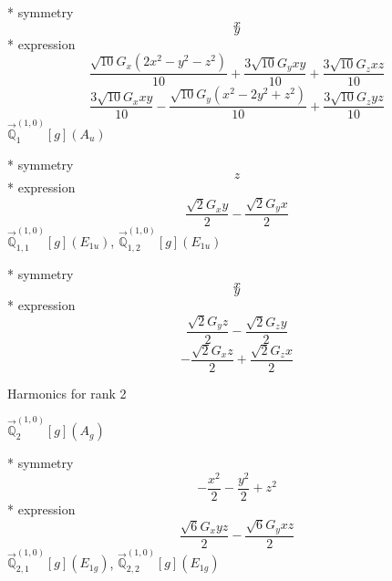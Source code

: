 \documentclass[fleqn,8pt]{jsarticle}
\begin{document}
\noindent\quad ** symmetry
\begin{dmath*}
x
\end{dmath*}
\begin{dmath*}
y
\end{dmath*}
\noindent\quad ** expression
\begin{dmath*}
\frac{\sqrt{10} G_{x} \left(2 x^{2} - y^{2} - z^{2}\right)}{10} + \frac{3 \sqrt{10} G_{y} x y}{10} + \frac{3 \sqrt{10} G_{z} x z}{10}
\end{dmath*}
\begin{dmath*}
\frac{3 \sqrt{10} G_{x} x y}{10} - \frac{\sqrt{10} G_{y} \left(x^{2} - 2 y^{2} + z^{2}\right)}{10} + \frac{3 \sqrt{10} G_{z} y z}{10}
\end{dmath*}
\noindent\quad $\vec{\mathbb{Q}}_{1}^{(1,0)}[g](A_{u})$

\noindent\quad ** symmetry
\begin{dmath*}
z
\end{dmath*}
\noindent\quad ** expression
\begin{dmath*}
\frac{\sqrt{2} G_{x} y}{2} - \frac{\sqrt{2} G_{y} x}{2}
\end{dmath*}
\noindent\quad $\vec{\mathbb{Q}}_{1,1}^{(1,0)}[g](E_{1u})$, $\vec{\mathbb{Q}}_{1,2}^{(1,0)}[g](E_{1u})$

\noindent\quad ** symmetry
\begin{dmath*}
x
\end{dmath*}
\begin{dmath*}
y
\end{dmath*}
\noindent\quad ** expression
\begin{dmath*}
\frac{\sqrt{2} G_{y} z}{2} - \frac{\sqrt{2} G_{z} y}{2}
\end{dmath*}
\begin{dmath*}
- \frac{\sqrt{2} G_{x} z}{2} + \frac{\sqrt{2} G_{z} x}{2}
\end{dmath*}

\noindent * Harmonics for rank 2

\noindent\quad $\vec{\mathbb{Q}}_{2}^{(1,0)}[g](A_{g})$

\noindent\quad ** symmetry
\begin{dmath*}
- \frac{x^{2}}{2} - \frac{y^{2}}{2} + z^{2}
\end{dmath*}
\noindent\quad ** expression
\begin{dmath*}
\frac{\sqrt{6} G_{x} y z}{2} - \frac{\sqrt{6} G_{y} x z}{2}
\end{dmath*}
\noindent\quad $\vec{\mathbb{Q}}_{2,1}^{(1,0)}[g](E_{1g})$, $\vec{\mathbb{Q}}_{2,2}^{(1,0)}[g](E_{1g})$
\end{document}
